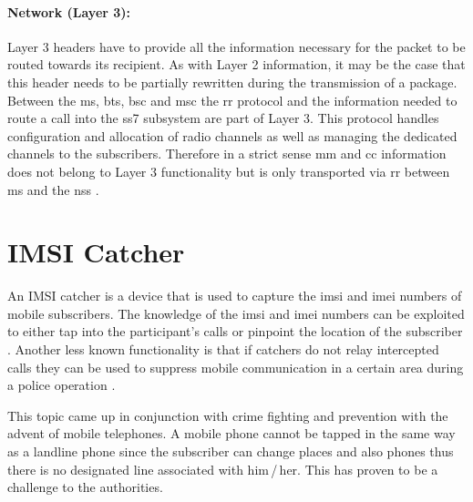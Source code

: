 \paragraph{Network (Layer 3):} Layer 3 headers have to provide all the information necessary for the packet to be routed towards its recipient.
As with Layer 2 information, it may be the case that this header needs to be partially rewritten during the transmission of a package.
Between the \gls{ms}, \gls{bts}, \gls{bsc} and \gls{msc} the \gls{rr} protocol and the information needed to route a call into the \gls{ss7} subsystem are part of Layer 3.
This protocol handles configuration and allocation of radio channels as well as managing the dedicated channels to the subscribers.
Therefore in a strict sense \gls{mm} and \gls{cc} information does not belong to Layer 3 functionality but is only transported via \gls{rr} between \gls{ms} and the \gls{nss} \cite{protocols1999}.

\section{IMSI Catcher}
\label{sec:catcher}
An IMSI catcher is a device that is used to capture the \gls{imsi} and \gls{imei} numbers of mobile subscribers.
The knowledge of the \gls{imsi} and \gls{imei} numbers can be exploited to either tap into the participant's calls or pinpoint the location of the subscriber \cite{fox}.
Another less known functionality is that if catchers do not relay intercepted calls they can be used to suppress mobile communication in a certain area \eg during a police operation \cite{imsi_wiki}.

This topic came up in conjunction with crime fighting and prevention with the advent of mobile telephones.
A mobile phone cannot be tapped in the same way as a landline phone since the subscriber can change places and also phones thus there is no designated line associated with him\,/\,her.
This has proven to be a challenge to the authorities.

